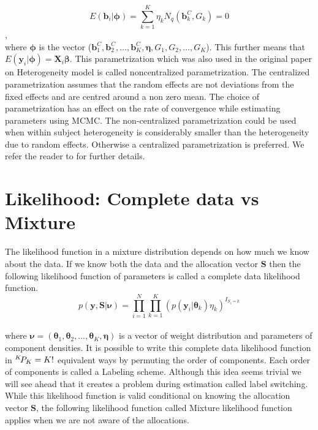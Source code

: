 $$E(\boldsymbol{b}_i | \boldsymbol{\phi}) = \sum_{k=1}^{K} \eta_k N_q(\boldsymbol{b}_k^C, G_k) = 0$$,\\
where $\boldsymbol{\phi}$ is the vector ($\boldsymbol{b}_1^C, \boldsymbol{b}_2^C, \ldots, \boldsymbol{b}_K^C, \boldsymbol{\eta}, G_1, G_2, \ldots, G_K$). This further means that $E(\boldsymbol{y}_i | \boldsymbol{\phi}) = \boldsymbol{X}_{i}\boldsymbol{\beta}$. This parametrization which was also used in the original paper on Heterogeneity model \citep{verbeke_linear_1996} is called noncentralized parametrization. The centralized parametrization assumes that the random effects are not deviations from the fixed effects and are centred around a non zero mean. The choice of parametrization has an effect on the rate of convergence while estimating parameters using MCMC. The non-centralized parametrization could be used when within subject heterogeneity is considerably smaller than the heterogeneity due to random effects. Otherwise a centralized parametrization is preferred. We refer the reader to \citet{fruhwirth-schnatter_bayesian_2004} for further details.

\section{Likelihood: Complete data vs Mixture}
The likelihood function in a mixture distribution depends on how much we know about the data. If we know both the data and the allocation vector $\boldsymbol{S}$ then the following likelihood function of parameters is called a complete data likelihood function.\\
$$p(\boldsymbol{y, S}|\boldsymbol{\nu}) = \prod_{i=1}^{N} \prod_{k=1}^{K} (p(\boldsymbol{y}_i | \boldsymbol{\theta}_k) \eta_k)^{I_{S_i=k}}$$\\
where $\boldsymbol{\nu} = (\boldsymbol{\theta}_1, \boldsymbol{\theta}_2, \ldots, \boldsymbol{\theta}_K, \boldsymbol{\eta})$ is a vector of weight distribution and parameters of component densities. It is possible to write this complete data likelihood function in ${}^{K}\!P_{K} = K!$ equivalent ways by permuting the order of components. Each order of components is called a Labeling scheme. Although this idea seems trivial we will see ahead that it creates a problem during estimation called label switching. While this likelihood function is valid conditional on knowing the allocation vector $\boldsymbol{S}$, the following likelihood function called Mixture likelihood function applies when we are not aware of the allocations.\\

